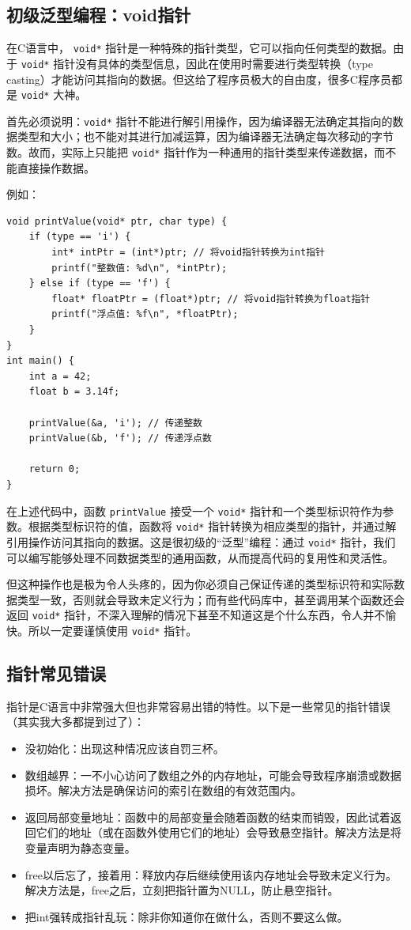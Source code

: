 \subsection{初级泛型编程：void指针}

在C语言中， \texttt{void*} 指针是一种特殊的指针类型，它可以指向任何类型的数据。由于 \texttt{void*} 指针没有具体的类型信息，因此在使用时需要进行类型转换（type casting）才能访问其指向的数据。但这给了程序员极大的自由度，很多C程序员都是 \texttt{void*} 大神。

首先必须说明：\texttt{void*} 指针不能进行解引用操作，因为编译器无法确定其指向的数据类型和大小；也不能对其进行加减运算，因为编译器无法确定每次移动的字节数。故而，实际上只能把 \texttt{void*} 指针作为一种通用的指针类型来传递数据，而不能直接操作数据。

例如：
\begin{verbatim}
void printValue(void* ptr, char type) {
    if (type == 'i') {
        int* intPtr = (int*)ptr; // 将void指针转换为int指针
        printf("整数值: %d\n", *intPtr);
    } else if (type == 'f') {
        float* floatPtr = (float*)ptr; // 将void指针转换为float指针
        printf("浮点值: %f\n", *floatPtr);
    }
}
int main() {
    int a = 42;
    float b = 3.14f;

    printValue(&a, 'i'); // 传递整数
    printValue(&b, 'f'); // 传递浮点数

    return 0;
}
\end{verbatim}
在上述代码中，函数 \texttt{printValue} 接受一个 \texttt{void*} 指针和一个类型标识符作为参数。根据类型标识符的值，函数将 \texttt{void*} 指针转换为相应类型的指针，并通过解引用操作访问其指向的数据。这是很初级的“泛型”编程：通过 \texttt{void*} 指针，我们可以编写能够处理不同数据类型的通用函数，从而提高代码的复用性和灵活性。

但这种操作也是极为令人头疼的，因为你必须自己保证传递的类型标识符和实际数据类型一致，否则就会导致未定义行为；而有些代码库中，甚至调用某个函数还会返回 \texttt{void*} 指针，不深入理解的情况下甚至不知道这是个什么东西，令人并不愉快。所以一定要谨慎使用 \texttt{void*} 指针。

\subsection{指针常见错误}

指针是C语言中非常强大但也非常容易出错的特性。以下是一些常见的指针错误（其实我大多都提到过了）：
\begin{itemize}
  \item 没初始化：出现这种情况应该自罚三杯。
  \item 数组越界：一不小心访问了数组之外的内存地址，可能会导致程序崩溃或数据损坏。解决方法是确保访问的索引在数组的有效范围内。
  \item 返回局部变量地址：函数中的局部变量会随着函数的结束而销毁，因此试着返回它们的地址（或在函数外使用它们的地址）会导致悬空指针。解决方法是将变量声明为静态变量。
  \item free以后忘了，接着用：释放内存后继续使用该内存地址会导致未定义行为。解决方法是，free之后，立刻把指针置为NULL，防止悬空指针。
  \item 把int强转成指针乱玩：除非你知道你在做什么，否则不要这么做。
\end{itemize}

